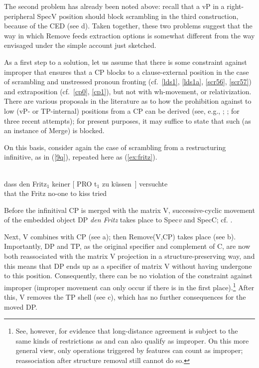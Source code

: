 \documentclass[output=paper]{langsci/langscibook}
\begin{document}
The second problem has already been noted above: recall that a vP in a
right-peripheral SpecV position should block scrambling in the third
construction, because of the \gls{CED} (see d). Taken together,
these two problems suggest that the way in which Remove feeds extraction
options is somewhat different from the way envisaged under the simple account
just sketched.

As a first step to a solution, let us assume that there is some constraint
against improper  that ensures that a CP blocks  to a
clause-external position in the case of scrambling and unstressed pronoun
fronting (cf.\ \ref{lds1}, \ref{lds1a}, \ref{scr56}, \ref{scr57}) and
extraposition (cf.\ \ref{cp0}, \ref{cp1}), but not with wh-movement,
 or relativization.  There are various proposals in the
literature as to how the prohibition against  to low (vP- or
TP-internal) positions from a CP can be derived (see, e.g.,
\citealt[Ch.~2]{Mueller:14:buf}; \citealt{Wurmbrand:15}; \citealt{Keine:16}
for three recent attempts); for present purposes, it may suffice to state that
such  (as an instance of Merge) is blocked.

On this basis, consider again the case of scrambling from a restructuring
infinitive, as in (\ref{9q}), repeated here as (\ref{ex:fritz}).

\ea\label{ex:fritz} \\
    \gll dass \label{fdsc4}den Fritz$_1$ keiner [ PRO t$_1$ zu küssen~] versuchte\\
        that the Fritz\textsubscript{\Acc} no-one\textsubscript{\Nom} {} {} {}  to kiss tried\\
\z

Before the infinitival CP is merged with the matrix V, successive-cyclic
movement of the embedded object DP {\itshape den Fritz} takes place to Spec\emph{v}
and SpecC; cf. .

Next, V combines with CP (see a); then Remove(V,CP) takes place
(see b). Importantly, DP and TP, as the original specifier and
complement of C, are now both reassociated with the matrix V projection in a
structure-preserving way, and this means that DP ends up as a specifier of
matrix V without having undergone  to this position. Consequently,
there can be no violation of the constraint against improper  (improper
movement can only occur if there is  in the first place).\footnote{See,
    however, \cite{Keine:16} for evidence that long-distance
    agreement is
    subject to the same kinds of restrictions as  and can also qualify
    as improper. On this more general view, only operations triggered by
features can count as improper; reassociation after structure removal still
cannot do so.} After this, V removes the TP shell (see c), which
has no further consequences for the moved DP.
\end{document}
